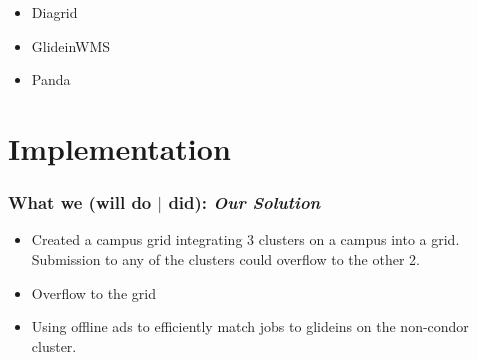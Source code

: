 \documentclass[11pt]{article}
\begin{document}
\begin{itemize}

\item
Diagrid

\item 
GlideinWMS

\item
Panda


\end{itemize}

\section{Implementation}
\label{sec:Implementation}

\subsubsection*{What we (will do $|$ did): {\em Our Solution}}
\begin{itemize}



\item
Created a campus grid integrating 3 clusters on a campus into a grid.  Submission to any of the clusters could overflow to the other 2.

\item
Overflow to the grid

\item
Using offline ads to efficiently match jobs to glideins on the non-condor cluster.

\end{itemize}
\end{document}

